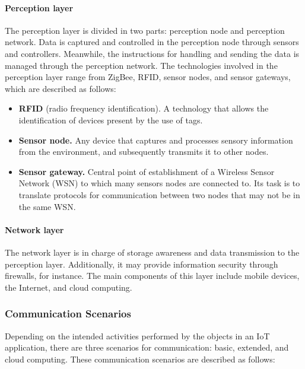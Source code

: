 \documentclass[12pt]{article}
\begin{document}
\paragraph{Perception layer} The perception layer is divided in two parts: perception node and perception network. Data is captured and controlled in the perception node through sensors and controllers. Meanwhile, the instructions for handling and sending the data is managed through the perception network. The technologies involved in the perception layer range from ZigBee, RFID, sensor nodes, and sensor gateways, which are described as follows:

\begin{itemize}
\item \textbf{RFID} (radio frequency identification). A technology that allows the identification of devices present by the use of tags. 
\item \textbf{Sensor node.} Any device that captures and processes sensory information from the environment, and subsequently transmits it to other nodes.
\item \textbf{Sensor gateway.} Central point of establishment of a Wireless Sensor Network (WSN) to which many sensors nodes are connected to. Its task is to translate protocols for communication between two nodes that may not be in the same WSN.
\end{itemize}

\paragraph{Network layer} The network layer is in charge of storage awareness and data transmission to the perception layer. Additionally, it may provide information security through firewalls, for instance. The main components of this layer include mobile devices, the Internet, and cloud computing.

\subsubsection{Communication Scenarios}

Depending on the intended activities performed by the objects in an IoT application, there are three scenarios for communication: basic, extended, and cloud computing. These communication scenarios are described as follows:
\end{document}
